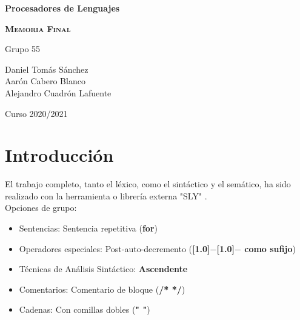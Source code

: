 \documentclass[11pt, , a4paper, titlepage]{article}
\newenvironment{myitemize}
{ \begin{itemize}
    \setlength{\itemsep}{0pt}
    \setlength{\parskip}{2pt}    }
{ \end{itemize}                  }
\newcommand{\minus}{\scalebox{0.75}[1.0]{$-$}}
\begin{document}
\begin{titlepage}
    \begin{center}
        \hrulefill

        \vspace{0.5cm}
        {\bfseries\Huge Procesadores de Lenguajes \par}
        \vspace{3cm}

        {\scshape \LARGE \textbf{Memoria Final}}

        \hrulefill

        \vspace{2.0cm}
    \end{center}

    \centering


    \Large{Grupo 55}\\
    \vspace{0.3cm}

    {\large Daniel Tomás Sánchez\\ Aarón Cabero Blanco\\ Alejandro Cuadrón Lafuente\par}

    \vspace{2cm}
    {\Large Curso 2020/2021 \par}
\end{titlepage}


\tableofcontents
\clearpage


\section{Introducción}
El trabajo completo, tanto el léxico, como el sintáctico y el semático, ha sido realizado con la herramienta o librería externa "SLY" \cite{SLY}.\\

Opciones de grupo:
\begin{myitemize}
    \renewcommand{\labelitemi}{$\circ$}
    \item Sentencias: Sentencia repetitiva (\textbf{for})
    \item   Operadores especiales: Post-auto-decremento (\textbf{\minus \minus \hspace{0.1cm} como sufijo})
    \item     Técnicas de Análisis Sintáctico: \textbf{Ascendente}
    \item     Comentarios: Comentario de bloque (\textbf{/* */})
    \item Cadenas: Con comillas dobles (\textbf{" \phantom{} "})
\end{myitemize}
\clearpage
\end{document}
